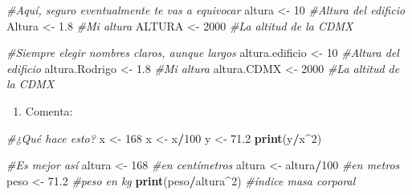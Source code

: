 \documentclass[
]{book}
\newenvironment{Shaded}{\begin{snugshade}}{\end{snugshade}}
\newcommand{\CommentTok}[1]{\textcolor[rgb]{0.56,0.35,0.01}{\textit{#1}}}
\newcommand{\DecValTok}[1]{\textcolor[rgb]{0.00,0.00,0.81}{#1}}
\newcommand{\FloatTok}[1]{\textcolor[rgb]{0.00,0.00,0.81}{#1}}
\newcommand{\KeywordTok}[1]{\textcolor[rgb]{0.13,0.29,0.53}{\textbf{#1}}}
\newcommand{\NormalTok}[1]{#1}
\newcommand{\OperatorTok}[1]{\textcolor[rgb]{0.81,0.36,0.00}{\textbf{#1}}}
\newcommand{\StringTok}[1]{\textcolor[rgb]{0.31,0.60,0.02}{#1}}
\providecommand{\tightlist}{%
  \setlength{\itemsep}{0pt}\setlength{\parskip}{0pt}}
\begin{document}
\begin{Shaded}
\begin{Highlighting}[]
\CommentTok{#Aquí, seguro eventualmente te vas a equivocar}
\NormalTok{altura <-}\StringTok{ }\DecValTok{10}   \CommentTok{#Altura del edificio}
\NormalTok{Altura <-}\StringTok{ }\FloatTok{1.8}  \CommentTok{#Mi altura}
\NormalTok{ALTURA <-}\StringTok{ }\DecValTok{2000} \CommentTok{#La altitud de la CDMX}

\CommentTok{#Siempre elegir nombres claros, aunque largos}
\NormalTok{altura.edificio <-}\StringTok{ }\DecValTok{10}   \CommentTok{#Altura del edificio}
\NormalTok{altura.Rodrigo  <-}\StringTok{ }\FloatTok{1.8}  \CommentTok{#Mi altura}
\NormalTok{altura.CDMX     <-}\StringTok{ }\DecValTok{2000} \CommentTok{#La altitud de la CDMX}
\end{Highlighting}
\end{Shaded}

\begin{enumerate}
\def\labelenumi{\arabic{enumi}.}
\setcounter{enumi}{5}
\tightlist
\item
  Comenta:
\end{enumerate}

\begin{Shaded}
\begin{Highlighting}[]
\CommentTok{#¿Qué hace esto?}
\NormalTok{x <-}\StringTok{ }\DecValTok{168}
\NormalTok{x <-}\StringTok{ }\NormalTok{x}\OperatorTok{/}\DecValTok{100}
\NormalTok{y <-}\StringTok{ }\FloatTok{71.2}
\KeywordTok{print}\NormalTok{(y}\OperatorTok{/}\NormalTok{x}\OperatorTok{^}\DecValTok{2}\NormalTok{) }
  
\CommentTok{#Es mejor así}
\NormalTok{altura <-}\StringTok{ }\DecValTok{168}        \CommentTok{#en centímetros}
\NormalTok{altura <-}\StringTok{ }\NormalTok{altura}\OperatorTok{/}\DecValTok{100} \CommentTok{#en metros}
\NormalTok{peso   <-}\StringTok{ }\FloatTok{71.2}       \CommentTok{#peso en kg}
\KeywordTok{print}\NormalTok{(peso}\OperatorTok{/}\NormalTok{altura}\OperatorTok{^}\DecValTok{2}\NormalTok{) }\CommentTok{#índice masa corporal}
\end{Highlighting}
\end{Shaded}
\end{document}

